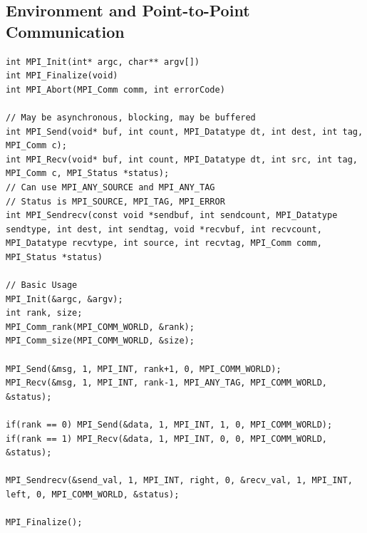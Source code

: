 \documentclass{article}
\begin{document}
\subsection{Environment and Point-to-Point Communication}
\begin{lstlisting}
int MPI_Init(int* argc, char** argv[])
int MPI_Finalize(void)
int MPI_Abort(MPI_Comm comm, int errorCode)

// May be asynchronous, blocking, may be buffered
int MPI_Send(void* buf, int count, MPI_Datatype dt, int dest, int tag, MPI_Comm c);
int MPI_Recv(void* buf, int count, MPI_Datatype dt, int src, int tag, MPI_Comm c, MPI_Status *status);
// Can use MPI_ANY_SOURCE and MPI_ANY_TAG
// Status is MPI_SOURCE, MPI_TAG, MPI_ERROR
int MPI_Sendrecv(const void *sendbuf, int sendcount, MPI_Datatype sendtype, int dest, int sendtag, void *recvbuf, int recvcount, MPI_Datatype recvtype, int source, int recvtag, MPI_Comm comm, MPI_Status *status)

// Basic Usage
MPI_Init(&argc, &argv);
int rank, size;
MPI_Comm_rank(MPI_COMM_WORLD, &rank);
MPI_Comm_size(MPI_COMM_WORLD, &size);

MPI_Send(&msg, 1, MPI_INT, rank+1, 0, MPI_COMM_WORLD);
MPI_Recv(&msg, 1, MPI_INT, rank-1, MPI_ANY_TAG, MPI_COMM_WORLD, &status);

if(rank == 0) MPI_Send(&data, 1, MPI_INT, 1, 0, MPI_COMM_WORLD);
if(rank == 1) MPI_Recv(&data, 1, MPI_INT, 0, 0, MPI_COMM_WORLD, &status);

MPI_Sendrecv(&send_val, 1, MPI_INT, right, 0, &recv_val, 1, MPI_INT, left, 0, MPI_COMM_WORLD, &status);

MPI_Finalize();
\end{lstlisting}
\end{document}
